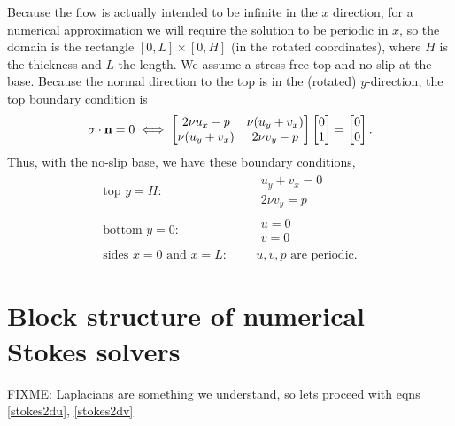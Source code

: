 Because the flow is actually intended to be infinite in the $x$ direction, for a numerical approximation we will require the solution to be periodic in $x$, so the domain is the rectangle $[0,L]\times[0,H]$ (in the rotated coordinates), where $H$ is the thickness and $L$ the length.  We assume a stress-free top and no slip at the base.  Because the normal direction to the top is in the (rotated) $y$-direction, the top boundary condition is
  $$\sigma\cdot\mathbf{n} = 0 \iff
\begin{bmatrix}
2 \nu u_x - p & \nu (u_y+v_x) \\
\nu (u_y+v_x) & 2 \nu v_y - p
\end{bmatrix} \begin{bmatrix}
0 \\ 1
\end{bmatrix} = \begin{bmatrix}
0 \\ 0
\end{bmatrix}.$$
Thus, with the no-slip base, we have these boundary conditions,
\begin{align}
\text{top $y=H$:}&    & &\begin{array}{l} u_y + v_x = 0 \\ 2 \nu v_y = p\end{array}  \label{bcstokestop} \\
\text{bottom $y=0$:}& & &\begin{array}{l} u = 0 \\ v = 0 \end{array} \label{bcstokesbottom} \\
\text{sides $x=0$ and $x=L$:}&
                      & &u,v,p \text{ are periodic}. \label{bcstokesperiodic}
\end{align}


\section{Block structure of numerical Stokes solvers}

FIXME: Laplacians are something we understand, so lets proceed with eqns \eqref{stokes2du}, \eqref{stokes2dv}

